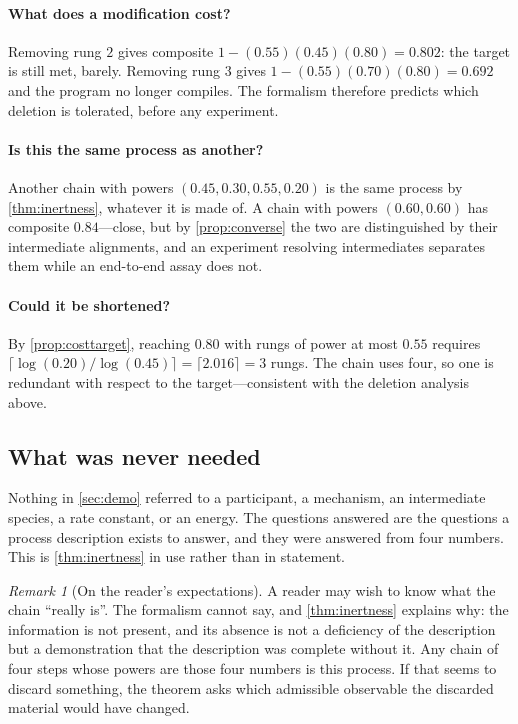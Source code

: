 \documentclass[11pt,twocolumn,a4paper]{article}
\theoremstyle{plain}
\theoremstyle{definition}
\theoremstyle{remark}
\newtheorem{remark}[theorem]{Remark}
\begin{document}
\paragraph{What does a modification cost?}
Removing rung $2$ gives composite $1-(0.55)(0.45)(0.80) = 0.802$: the target is
still met, barely. Removing rung $3$ gives $1-(0.55)(0.70)(0.80) = 0.692$ and
the program no longer compiles. The formalism therefore predicts which deletion
is tolerated, before any experiment.

\paragraph{Is this the same process as another?}
Another chain with powers $(0.45,0.30,0.55,0.20)$ is the same process by
\cref{thm:inertness}, whatever it is made of. A chain with powers
$(0.60,0.60)$ has composite $0.84$---close, but by \cref{prop:converse} the two
are distinguished by their intermediate alignments, and an experiment resolving
intermediates separates them while an end-to-end assay does not.

\paragraph{Could it be shortened?}
By \cref{prop:costtarget}, reaching $0.80$ with rungs of power at most $0.55$
requires $\lceil \log(0.20)/\log(0.45) \rceil = \lceil 2.016 \rceil = 3$ rungs.
The chain uses four, so one is redundant with respect to the target---consistent
with the deletion analysis above.

\subsection{What was never needed}

Nothing in \cref{sec:demo} referred to a participant, a mechanism, an
intermediate species, a rate constant, or an energy. The questions answered are
the questions a process description exists to answer, and they were answered
from four numbers. This is \cref{thm:inertness} in use rather than in statement.

\begin{remark}[On the reader's expectations]
\label{rem:expectations}
A reader may wish to know what the chain ``really is''. The formalism cannot
say, and \cref{thm:inertness} explains why: the information is not present, and
its absence is not a deficiency of the description but a demonstration that the
description was complete without it. Any chain of four steps whose powers are
those four numbers is this process. If that seems to discard something, the
theorem asks which admissible observable the discarded material would have
changed.
\end{remark}
\end{document}

